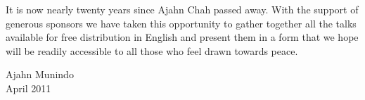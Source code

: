 It is now nearly twenty years since Ajahn Chah passed away. With the support of generous sponsors we have taken this opportunity to gather together all the talks available for free distribution in English and present them in a form that we hope will be readily accessible to all those who feel drawn towards peace.
\vspace*{2\baselineskip}

{\raggedleft\par Ajahn Munindo\\
April 2011 \par}

\thispagestyle{chapterpage}
